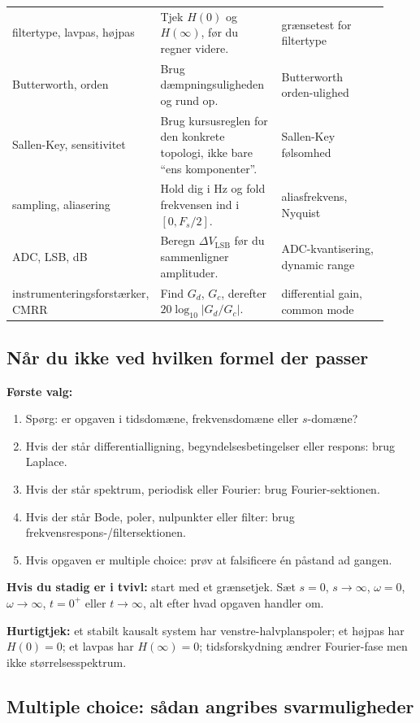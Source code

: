 \begin{tabular}{p{0.26\linewidth}p{0.33\linewidth}p{0.33\linewidth}}
filtertype, lavpas, højpas & Tjek \(H(0)\) og \(H(\infty)\), før du regner videre. & grænsetest for filtertype \\
Butterworth, orden & Brug dæmpningsuligheden og rund op. & Butterworth orden-ulighed \\
Sallen-Key, sensitivitet & Brug kursusreglen for den konkrete topologi, ikke bare ``ens komponenter''. & Sallen-Key følsomhed \\
sampling, aliasering & Hold dig i Hz og fold frekvensen ind i \([0,F_s/2]\). & aliasfrekvens, Nyquist \\
ADC, LSB, dB & Beregn \(\Delta V_{\mathrm{LSB}}\) før du sammenligner amplituder. & ADC-kvantisering, dynamic range \\
instrumenteringsforstærker, CMRR & Find \(G_d\), \(G_c\), derefter \(20\log_{10}|G_d/G_c|\). & differential gain, common mode \\
\bottomrule
\end{tabular}

\subsection{Når du ikke ved hvilken formel der passer}

\textbf{Første valg:}
\begin{enumerate}
    \item Spørg: er opgaven i tidsdomæne, frekvensdomæne eller \(s\)-domæne?
    \item Hvis der står differentialligning, begyndelsesbetingelser eller respons: brug Laplace.
    \item Hvis der står spektrum, periodisk eller Fourier: brug Fourier-sektionen.
    \item Hvis der står Bode, poler, nulpunkter eller filter: brug frekvensrespons-/filtersektionen.
    \item Hvis opgaven er multiple choice: prøv at falsificere én påstand ad gangen.
\end{enumerate}

\textbf{Hvis du stadig er i tvivl:} start med et grænsetjek. Sæt \(s=0\), \(s\to\infty\), \(\omega=0\), \(\omega\to\infty\), \(t=0^+\) eller \(t\to\infty\), alt efter hvad opgaven handler om.

\textbf{Hurtigtjek:} et stabilt kausalt system har venstre-halvplanspoler; et højpas har \(H(0)=0\); et lavpas har \(H(\infty)=0\); tidsforskydning ændrer Fourier-fase men ikke størrelsesspektrum.

\subsection{Multiple choice: sådan angribes svarmuligheder}

